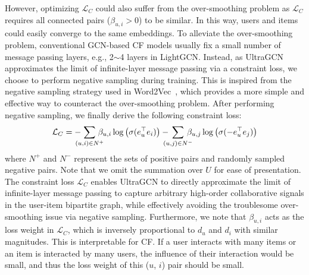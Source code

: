 \documentclass[sigconf,authorversion]{acmart}
\begin{document}
However, optimizing $\mathcal{L}_C$ could also suffer from the over-smoothing problem as $\mathcal{L}_C$ requires all connected pairs ($\beta_{u,i} > 0$) to be similar. In this way, users and items could easily converge to the same embeddings. 
To alleviate the over-smoothing problem, conventional GCN-based CF models usually fix a small number of message passing layers, e.g., 2$\sim$4 layers in LightGCN. Instead, as UltraGCN approximates the limit of infinite-layer message passing via a constraint loss, we choose to perform negative sampling during training. This is inspired from the negative sampling strategy used in Word2Vec~\cite{word2vec}, which provides a more simple and effective way to counteract the over-smoothing problem. 
After performing negative sampling, we finally derive the following constraint loss:
\begin{eqnarray}
\begin{split}
\mathcal{L}_C=-\hspace{-2ex}\sum_{(u,i)\in N^+}\hspace{-2ex}\beta_{u,i} \log \big(\sigma(e_u^{\top} e_{i})\big) -\hspace{-2ex}\sum_{(u,j)\in N^-}  \hspace{-2ex}\beta_{u,j} \log \big(\sigma(-e_u^{\top} e_{j} )\big)\label{Lc_loss}
\end{split}
\end{eqnarray}
where $N^+$ and $N^-$ represent the sets of positive pairs and randomly sampled negative pairs. Note that we omit the summation over $U$ for ease of presentation.
The constraint loss $\mathcal{L}_C$ enables UltraGCN to directly approximate the limit of infinite-layer message passing to capture arbitrary high-order collaborative signals in the user-item bipartite graph, while effectively avoiding the troublesome over-smoothing issue via negative sampling.  
Furthermore, we note that $\beta_{u, i}$ acts as the loss weight in $\mathcal{L}_C$, which is inversely proportional to ${d}_u$ and ${d}_i$ with similar magnitudes. This is interpretable for CF. If a user interacts with many items or an item is interacted by many users, the influence of their interaction would be small, and thus the loss weight of this ($u$, $i$) pair should be small.
\end{document}
